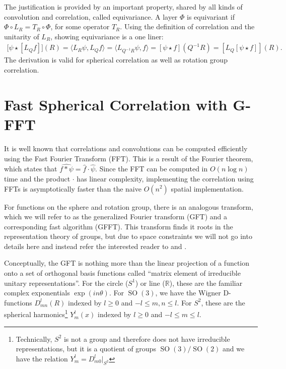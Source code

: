 \documentclass{article} %
\newcommand{\R}{\mathbb{R}}
\newcommand{\SO}[1]{\ensuremath{\operatorname{SO}(#1)}}
\begin{document}
The justification is provided by an important property, shared by all kinds of convolution and correlation, called equivariance.
A layer $\Phi$ is equivariant if $\Phi \circ L_R = T_R \circ \Phi$, for some operator $T_R$.
Using the definition of correlation and the unitarity of $L_R$, showing equivariance is a one liner:
\begin{equation}
  \begin{aligned}
    \lbrack \psi \star [L_{Q} f]](R)
    = \langle L_R \psi, L_Q f \rangle
    = \langle L_{Q^{-1} R} \psi, f \rangle
    = [\psi \star f](Q^{-1}R)
    = [L_Q [\psi \star f]](R).
  \end{aligned}
\end{equation}
The derivation is valid for spherical correlation as well as rotation group correlation.


\section{Fast Spherical Correlation with G-FFT}

It is well known that correlations and convolutions can be computed efficiently using the Fast Fourier Transform (FFT).
This is a result of the Fourier theorem, which states that
$\widehat{f * \psi} = \hat{f} \cdot \hat{\psi}$.
Since the FFT can be computed in $O(n \log n)$ time and the product $\cdot$ has linear complexity, implementing the correlation using FFTs is asymptotically faster than the naive $O(n^2)$ spatial implementation.

For functions on the sphere and rotation group, there is an analogous transform, which we will refer to as the generalized Fourier transform (GFT) and a corresponding fast algorithm (GFFT).
This transform finds it roots in the representation theory of groups, but due to space constraints we will not go into details here and instead refer the interested reader to \citet{Sugiura1976} and \citet{Folland1995}.

Conceptually, the GFT is nothing more than the linear projection of a function onto a set of orthogonal basis functions called ``matrix element of irreducible unitary representations''.
For the circle ($S^1$) or line ($\R$), these are the familiar complex exponentials $\exp(i n \theta)$.
For $\SO3$, we have the Wigner D-functions $D^l_{mn}(R)$ indexed by $l \geq 0$ and $-l \leq m, n \leq l$.
For $S^2$, these are the spherical harmonics\footnote{Technically, $S^2$ is not a group and therefore does not have irreducible representations, but it is a quotient of groups $\SO3/\SO2$ and we have the relation $Y^l_m = D^l_{m0}|_{S^2}$} $Y^l_m(x)$ indexed by $l \geq 0$ and $-l \leq m \leq l$.
\end{document}
